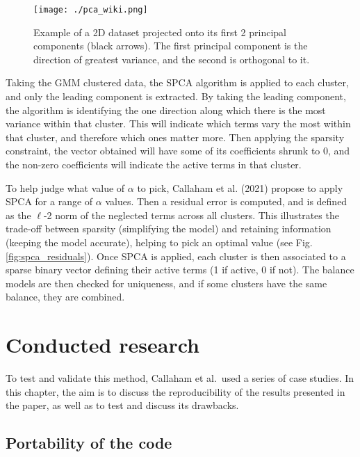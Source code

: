 \documentclass[12pt]{report} %
\begin{document}
\begin{figure}[htbp]
  \centering
  \texttt{[image: ./pca\_wiki.png]}
  \caption{Example of a 2D dataset projected onto its first 2 principal components (black arrows). The first principal component is the direction of greatest variance, and the second is orthogonal to it. \cite{pca_wikipedia}}
  \label{fig:PCA_wiki}
\end{figure}

Taking the GMM clustered data, the SPCA algorithm is applied to each cluster, and only the leading component is extracted. By taking the leading component, the algorithm is identifying the one direction along which there is the most variance within that cluster. This will indicate which terms vary the most within that cluster, and therefore which ones matter more. Then applying the sparsity constraint, the vector obtained will have some of its coefficients shrunk to 0, and the non-zero coefficients will indicate the active terms in that cluster.

\vspace{5mm}

To help judge what value of $\alpha$ to pick, Callaham et al. (2021) propose to apply SPCA for a range of $\alpha$ values. Then a residual error is computed, and is defined as the $\ell$-2 norm of the neglected terms across all clusters. This illustrates the trade-off between sparsity (simplifying the model) and retaining information (keeping the model accurate), helping to pick an optimal value (see Fig. \ref{fig:spca_residuals}). Once SPCA is applied, each cluster is then associated to a sparse binary vector defining their active terms (1 if active, 0 if not). The balance models are then checked for uniqueness, and if some clusters have the same balance, they are combined.


\chapter{Conducted research}

To test and validate this method, Callaham et al.\ used a series of case studies\cite{callaham2021learning}. In this chapter, the aim is to discuss the reproducibility of the results presented in the paper, as well as to test and discuss its drawbacks.

\section{Portability of the code}
\end{document}
